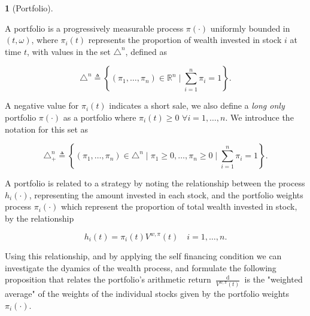 \documentclass[british]{amsart} \usepackage{lmodern}
\numberwithin{equation}{section} \numberwithin{figure}{section}
\theoremstyle{plain} \newtheorem{thm}{\protect\theoremname}[section]
\theoremstyle{definition} \newtheorem{defn}[thm]{\protect\definitionname}
\theoremstyle{plain} \newtheorem{assumption}[thm]{\protect\assumptionname}
\theoremstyle{plain} \newtheorem{lem}[thm]{\protect\lemmaname}
\theoremstyle{plain} \newtheorem{prop}[thm]{\protect\propositionname}
\theoremstyle{remark} \newtheorem{rem}[thm]{\protect\remarkname}
\theoremstyle{plain} \newtheorem{cor}[thm]{\protect\corollaryname}
\renewcommand{\d}[1]{\mathop{\mathrm{d}{#1}}}
\newcommand{\defeq}{\mathop{\triangleq}} \newcommand{\almostsurely}{\text{a.s.}}
\newcommand{\rangei}{i=1,\dots,n} \newcommand{\measure}{\mathbb{P}}
\newcommand{\V}{V^{w,\pi}}
\begin{document}
\begin{defn} [Portfolio]
  \label{def:portfolio}

  A portfolio is a progressively measurable process $\pi(\cdot)$ uniformly
  bounded in $(t,\omega)$, where $\pi_{i}(t)$ represents the proportion of wealth
  invested in stock $i$ at time $t$, with values in the set $\triangle^{n}$,
  defined as 

  \begin{equation*}
    \triangle^{n} \defeq 
    \left\{
          (\pi_{1}, \dots, \pi_{n}) \in \mathbb{R}^{n} 
          \mid
          \sum_{i=1}^{n} \pi_{i} = 1
    \right\}.
  \end{equation*}

  A negative value for $\pi_{i}(t)$ indicates a short sale, we also define a
  \textit{long only} portfolio $\pi(\cdot)$ as a portfolio where $\pi_{i}(t) \ge
  0$ $\forall \rangei$. We introduce the notation for this set as

  \begin{equation*}
    \triangle_{+}^{n} \defeq 
    \left\{
          (\pi_{1}, \dots, \pi_{n}) \in \triangle^{n} 
          \mid
          \pi_{1} \ge 0, \dots, \pi_{n} \ge 0
          \mid
          \sum_{i=1}^{n} \pi_{i} = 1
    \right\}.
  \end{equation*}

\end{defn}

A portfolio is related to a strategy by noting the relationship between the
process $h_{i}(\cdot)$, representing the amount invested in each stock, and the
portfolio weights process $\pi_{i}(\cdot)$ which represent the proportion of
total wealth invested in stock, by the relationship

\begin{equation}
  \label{eq:wealthinvestedbyportfolio}
  h_i(t) = \pi_{i}(t)\V(t)
  \quad \rangei.
\end{equation}

Using this relationship, and by applying the self financing condition we can
investigate the dyamics of the wealth process, and formulate the following
proposition that relates the portfolio's arithmetic return
$\frac{\d{\V(t)}}{\V(t)}$ is the "weighted average" of the weights of the
individual stocks given by the portfolio weights $\pi_{i}(\cdot)$.
\end{document}
